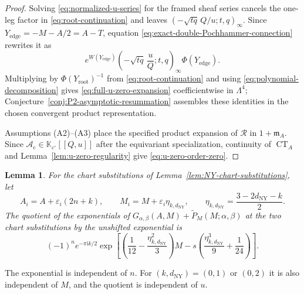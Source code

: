 \documentclass{amsart}
\newtheorem{lemma}{Lemma}
\theoremstyle{definition}
\numberwithin{equation}{section}
\newcommand{\K}{\mathbb K}
\newcommand{\eps}{\varepsilon}
\begin{document}
\begin{proof}
Solving \eqref{eq:normalized-u-series} for the framed sheaf series cancels the one-leg factor in \eqref{eq:root-continuation} and leaves \(\left(-\sqrt{tq}\,Q/u;t,q\right)_\infty\).  Since \(Y_{\mathrm{edge}}=-M-A/2=A-T\), equation \eqref{eq:exact-double-Pochhammer-connection} rewrites it as
\[
 e^{W(Y_{\mathrm{edge}})}
 \left(-\sqrt{tq}\,\frac uQ;t,q\right)_\infty
 \Phi(Y_{\mathrm{edge}}).
\]
Multiplying by \(\Phi(Y_{\mathrm{root}})^{-1}\) from \eqref{eq:root-continuation} and using \eqref{eq:polynomial-decomposition} gives \eqref{eq:full-u-zero-expansion} coefficientwise in \(\Lambda^4\); Conjecture~\ref{conj:P2-asymptotic-resummation} assembles these identities in the chosen convergent product representation.

Assumptions (A2)--(A3) place the specified product expansion of \(\mathcal R\) in \(1+\mathfrak m_A\).  Since \(\mathscr A_{\mathrm c}\in\K_{\eps^\circ}[[Q,u]]\) after the equivariant specialization, continuity of \(\operatorname{CT}_A\) and Lemma~\ref{lem:u-zero-regularity} give \eqref{eq:u-zero-order-zero}.
\end{proof}

\begin{lemma}
\label{lem:two-chart-factor}
For the chart substitutions of Lemma~\ref{lem:NY-chart-substitutions}, let
\begin{equation}
 A_i=A+\eps_i(2n+k),\qquad
 M_i=M+\eps_i\eta_{k,d_{\mathrm{NY}}},\qquad
 \eta_{k,d_{\mathrm{NY}}}
 =\frac{3-2d_{\mathrm{NY}}-k}{2}.
\label{eq:centered-additive-chart-data}
\end{equation}
The quotient of the exponentials of \(G_{\alpha,\beta}(A,M)+\widetilde P_M(M;\alpha,\beta)\) at the two chart substitutions by the unshifted exponential is
\begin{equation}
 (-1)^n e^{-\pi\mathrm{i}k/2}
 \exp\left[
 \left(\frac1{12}-\frac{\eta_{k,d_{\mathrm{NY}}}^2}{3}\right)M
 -s\left(\frac{\eta_{k,d_{\mathrm{NY}}}^3}{9}
          +\frac1{24}\right)\right].
\label{eq:two-chart-factor}
\end{equation}
\end{lemma}

The exponential is independent of \(n\).  For \((k,d_{\mathrm{NY}})=(0,1)\) or \((0,2)\) it is also independent of \(M\), and the quotient is independent of \(u\).
\end{document}
